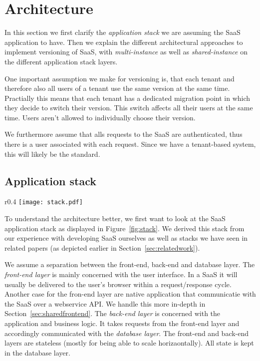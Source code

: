 \section{Architecture}
\label{sec:architecture}

In this section we first clarify the \emph{application stack} we are assuming the SaaS application to have. Then we explain the different architectural approaches to implement versioning of SaaS, with \emph{multi-instance} as well as \emph{shared-instance} on the different application stack layers.

One important assumption we make for versioning is, that each tenant and therefore also all users of a tenant use the same version at the same time. Practially this means that each tenant has a dedicated migration point in which they decide to switch their version. This switch affects all their users at the same time. Users aren't allowed to individually choose their version.

We furthermore assume that alls requests to the SaaS are authenticated, thus there is a user associated with each request. Since we have a tenant-based system, this will likely be the standard.

\subsection{Application stack}

\begin{wrapfigure}{r}{0.4\textwidth}
\centering
\texttt{[image: stack.pdf]}
\caption{Simplified Application Stack}
\label{fig:stack}
\end{wrapfigure}

To understand the architecture better, we first want to look at the SaaS application stack as displayed in Figure~\ref{fig:stack}. We derived this stack from our experience with developing SaaS ourselves as well as stacks we have seen in related papers (as depicted earlier in Section~\ref{sec:relatedwork}).

We assume a separation between the front-end, back-end and database layer. The \emph{front-end layer} is mainly concerned with the user interface. In a SaaS it will usually be delivered to the user's browser within a request/response cycle. Another case for the fron-end layer are native application that communicatie with the SaaS over a webservice API. We handle this more in-depth in Section~\ref{sec:sharedfrontend}. The \emph{back-end layer} is concerned with the application and business logic. It takes requests from the front-end layer and accordingly communicated with the \emph{database layer}. The front-end and back-end layers are stateless (mostly for being able to scale horizaontally). All state is kept in the database layer.

